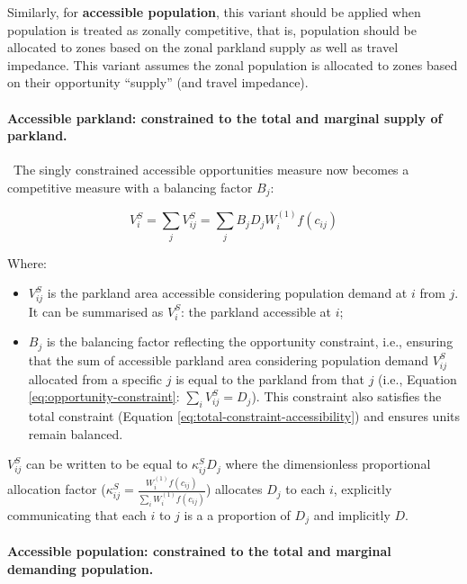 \documentclass[
11pt, %
oneside, %
english, %
singlespacing, %
]{macthesis} %
\def\tightlist{}
\begin{document}
Similarly, for \textbf{accessible population}, this variant should be applied when population is treated as zonally competitive, that is, population should be allocated to zones based on the zonal parkland supply as well as travel impedance. This variant assumes the zonal population is allocated to zones based on their opportunity ``supply'' (and travel impedance).

\paragraph{Accessible parkland: constrained to the total and marginal supply of parkland.}\label{accessible-parkland-constrained-to-the-total-and-marginal-supply-of-parkland.}

~The singly constrained accessible opportunities measure now becomes a competitive measure with a balancing factor \(B_j\):

\begin{equation}
\label{eq:opportunity-constrained-accessibility-park}
V^S_{i} = \sum_j V^S_{ij} = \sum_j B_j D_j W_i^{(1)} f(c_{ij})
\end{equation} 

Where:

\begin{itemize}
\tightlist
\item
  \(V^S_{ij}\) is the parkland area accessible considering population demand at \(i\) from \(j\). It can be summarised as \(V^S_{i}\): the parkland accessible at \(i\);
\item
  \(B_j\) is the balancing factor reflecting the opportunity constraint, i.e., ensuring that the sum of accessible parkland area considering population demand \(V^S_{ij}\) allocated from a specific \(j\) is equal to the parkland from that \(j\) (i.e., Equation \ref{eq:opportunity-constraint}: \(\sum_i V^S_{ij} =  D_j\)). This constraint also satisfies the total constraint (Equation \ref{eq:total-constraint-accessibility}) and ensures units remain balanced.
\end{itemize}

\(V_{ij}^S\) can be written to be equal to \(\kappa_{ij}^S D_j\) where the dimensionless proportional allocation factor (\(\kappa_{ij}^S = \frac{W_i^{(1)} f(c_{ij})}{\sum_i W_i^{(1)} f(c_{ij})}\)) allocates \(D_j\) to each \(i\), explicitly communicating that each \(i\) to \(j\) is a a proportion of \(D_j\) and implicitly \(D\).

\paragraph{Accessible population: constrained to the total and marginal demanding population.}\label{accessible-population-constrained-to-the-total-and-marginal-demanding-population.}
\end{document}
